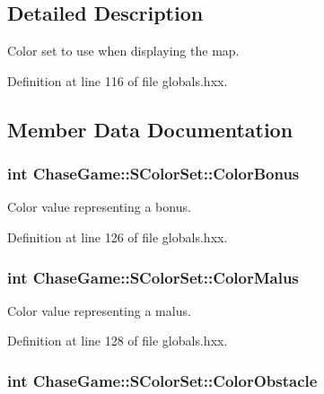 \subsection{Detailed Description}
Color set to use when displaying the map. 

Definition at line 116 of file globals.\-hxx.



\subsection{Member Data Documentation}
\hypertarget{struct_chase_game_1_1_s_color_set_aacd34496b36640358ecae127f6bb6cc4}{
\subsubsection[{Color\-Bonus}]{\setlength{\rightskip}{0pt plus 5cm}int Chase\-Game\-::\-S\-Color\-Set\-::\-Color\-Bonus}}\label{struct_chase_game_1_1_s_color_set_aacd34496b36640358ecae127f6bb6cc4}


Color value representing a bonus. 



Definition at line 126 of file globals.\-hxx.

\hypertarget{struct_chase_game_1_1_s_color_set_aa2eb52b7d1fb4059da9935a230715498}{
\subsubsection[{Color\-Malus}]{\setlength{\rightskip}{0pt plus 5cm}int Chase\-Game\-::\-S\-Color\-Set\-::\-Color\-Malus}}\label{struct_chase_game_1_1_s_color_set_aa2eb52b7d1fb4059da9935a230715498}


Color value representing a malus. 



Definition at line 128 of file globals.\-hxx.

\hypertarget{struct_chase_game_1_1_s_color_set_acb1e4df5c042ae8ca8a66d7de26a9148}{
\subsubsection[{Color\-Obstacle}]{\setlength{\rightskip}{0pt plus 5cm}int Chase\-Game\-::\-S\-Color\-Set\-::\-Color\-Obstacle}}\label{struct_chase_game_1_1_s_color_set_acb1e4df5c042ae8ca8a66d7de26a9148}


